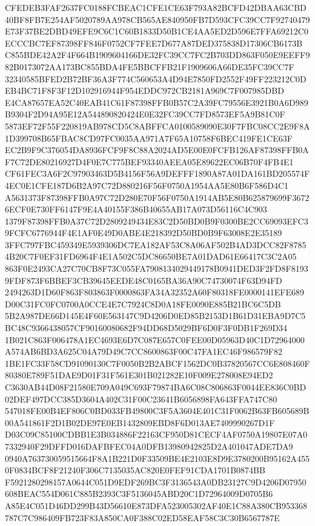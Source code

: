 \documentclass[UTF8,fontset=fandol,zihao=-4,a4paper]{ctexart}
\begin{document}
{{CFEDEB3FAF2637FC0188FCBEAC1CFE1CE63F793A82BCFD42DBAA63CBD40BF8FB7E254AF5020789AA978CB565AE840950FB7D593CFC39CC7F92740479
E73F37BE2DBD49EFE9C6C1C60B1833D50B1CE4AA5ED2D596E7FFA69212C0ECCCBC7EF87398FF846F0752CF7FEE7D677A87DED375838D17306CB6173B
C855BDE42A2F4F664B1909604166DE32FC39CC7FC2B703DD863F050E9EEFF982B0173072AA173BC855BDA4FE5BBCFFB21F1909606A66DE35FC39CC7F
32340585BFED2B72BF36A3F774C560653A4D94E7850FD2552F49FF223212C0DEB4BC71F8F3F12D102916944F954EDDC972CB2181A969C7F007985DBD
E4CA87657EA52C40EAB41C61F87398FFB0B57C2A39FC79556E3921B0A6D989B9304F2D94A95E12A544890820424E0E32FC39CC7FD8573EF5A9B81C0F
5873EF72F55F220819AB978CD5C8ABFFCA0100589090E30F7FBC08CC2E9F8A1D399708B65FBAC8CD97FC0035AA971A7F65A10758F6BEC419FE1CE63F
EC2B9F9C376054DA8936FCF9F8C88A2024AD5E00E0FCFB126AF87398FFB0AF7C72DE80216927D4F0E7C775BEF93340AEEA05E89622EC06B70F4FB4E1
CF61FEC3A6F2C97903463D5B4156F56A9DEFFF1890A87A01DA161BD205574F4EC0E1CFE187D6B2A97C72D880216F56F0750A1954AA5E80B6F586D4C1
A5631373F87398FFB0A97C72D280E70F56F0750A1914AB5E80B625879699F36726ECF0E730FF6147F9E4A40155F386B40655AB17A073D56116C4C903
1379F87398FFB0A37C72D2809249434E83C2D50BD0B9F0300BE2CC69093EFC39FCFC6776944F4E1AF0E49D0ABE4E218392D50BD0B9F63008E2E35189
3FFC797FBC459349E5939306DC7EA182AF53C8A06AF502B4AD3DCC82F87854B20C7F0EF31FD6964F4E1A502C5DC86650BE7A01DAD61E66417C3C2A05
863F0E2493CA27C70CB8F73C055FA7908134029449178B0941DED3F2FD8F81939FDF873F6BBEF3CB39645EEDE48C0165BA36A90C74730074F63D94FD
2494263D1D60F863F803863F0000863FA34A32352A60F80318FE0000141EFE689D00C31FC0FC0700A0CCE4E7C7924C8D0A18FE0090E885B21BC6C5DB
5B2A987DE66D145E4F60E563147C9D4206D0ED85B2153D1B61D31EBA9D7C5BC48C9366438057CF90160080682F94DD68D5029BF6D0F3F0DB1F269D34
1B021C863F006478A1EC4693E6D7C087E657C0FEE00D05963D40C1D72964000A574AB6BD3A625C04A79D49C7CC8600863F00C47FA1EC46F986579F82
1BE1FC33F58CD91090130C7F0050B2B2ABCF1562DC0B37820567CC6E808460F80380E789F51DAE9D01F31F561E301B021282E10F009E278008E94ED2
C3630AB44D08F21580E709A049C693F79874BA6C08C806863F0044EE836C0BD02DEF497DCC385D3604A402C31F00C23641B6056898FA643FFA747C80
547018FE00B4EF806C0BD033FB49800C3F5A3604E401C31F0062B63FB605689B00A541861F2D1B02DE97E0EB1432809EBD8F6D013AE7409990267D1F
D03C09C85100CDBB1E3B034886F22163CF950D81CECF4AF0750A19807E07A07332940F29DFFD016DAFBFEC04A0DFB13980942825D2A401047ADE7DA9
0940A763730059515664F8A1B221D0F33509BE4E2103E8D9E3780200B95162A4550F0834BCF8F21240F306C7135035AC820E0FEF91CDA1701B0874BB
F5921280298157A0644C051D9EDF269BC3F3136543A0DB23127C9D4206D07950608BEAC554D061C885B2393C3F5136045ABD20C1D72964009D0705B6
A85E4C051D46DD299B43D56610E873DFA523005302AF40E1C88A380CB953368787C7C986409FB723F83A850CA0F388C02ED58EAF58C3C30B6567787E
}}
\end{document}
